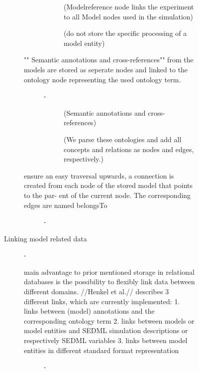 \begin{description}
\begin{description}
\begin{description}
\begin{description}
\begin{description}
\begin{description}
            \item[ \cite{Henkel2015} ] (Modelreference node links the experiment to all Model nodes used in the simulation)
            \item[ \cite{Henkel2015} ] (do not store the specific processing of a model entity)
          \end{description} %
          \item["" Semantic annotations and cross-references"" from the models are stored as seperate nodes and linked to the ontology node representing the used ontology term.] - 
          \begin{description}
            \item[ \cite{Henkel2015} ] (Semantic annotations and cross-references)
            \item[ \cite{Henkel2015} ] (We parse these ontologies and add all concepts and relations as nodes and edges, respectively.)
          \end{description} %
          \item[ensure an easy traversal upwards, a connection is created from each node of the stored model that points to the par- ent of the current node. The corresponding edges are named belongsTo] - 
        \end{description} %
        \item[Linking model related data] - 
        \begin{description}
          \item[main advantage to prior mentioned storage in relational databases is the possibility to flexibly link data between different domains. //Henkel et al.// describes 3 different links, which are currently implemented: 1. links between (model) annotations and the corresponding ontology term 2. links between models or model entities and SEDML simulation descriptions or respectively SEDML variables 3. links between model entities in different standard format representation] - 

\end{description}
\end{description}
\end{description}
\end{description}
\end{description}

